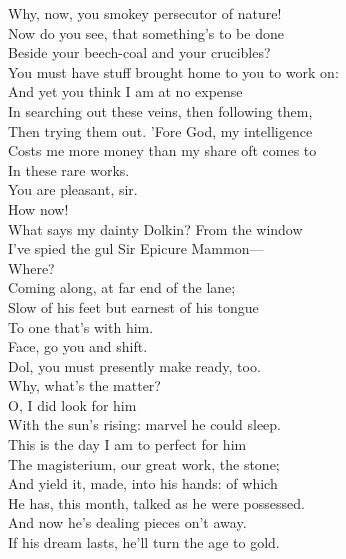 \documentclass[a4paper,oneside,12pt]{memoir}
\begin{document}
\begin{drama*}
\facespeaks Why, now, you smokey persecutor of nature!\\
Now do you see, that something's to be done\\
Beside your beech-coal and your crucibles?\\
You must have stuff brought home to you to work on:\\
And yet you think I am at no expense\\
In searching out these veins, then following them,\\
Then trying them out. 'Fore God, my intelligence\\
Costs me more money than my share oft comes to\\
In these rare works.\\
\subtlespeaks {} You are pleasant, sir.\\
 How now!\\
\facespeaks What says my dainty Dolkin?
\dolspeaks {} From the window\\
I've spied the gul Sir Epicure Mammon---\\
\subtlespeaks {} Where?\\
\dolspeaks Coming along, at far end of the lane;\\
Slow of his feet but earnest of his tongue\\
To one that's with him.\\
\subtlespeaks {} Face, go you and shift.\\
Dol, you must presently make ready, too.\\
\dolspeaks Why, what's the matter?\\
\subtlespeaks {} O, I did look for him\\
With the sun's rising: marvel he could sleep.\\
This is the day I am to perfect for him\\
The magisterium, our great work, the stone;\\
And yield it, made, into his hands: of which\\
He has, this month, talked as he were possessed.\\
And now he's dealing pieces on't away.\\
If his dream lasts, he'll turn the age to gold.\\

\end{drama*}
\end{document}
